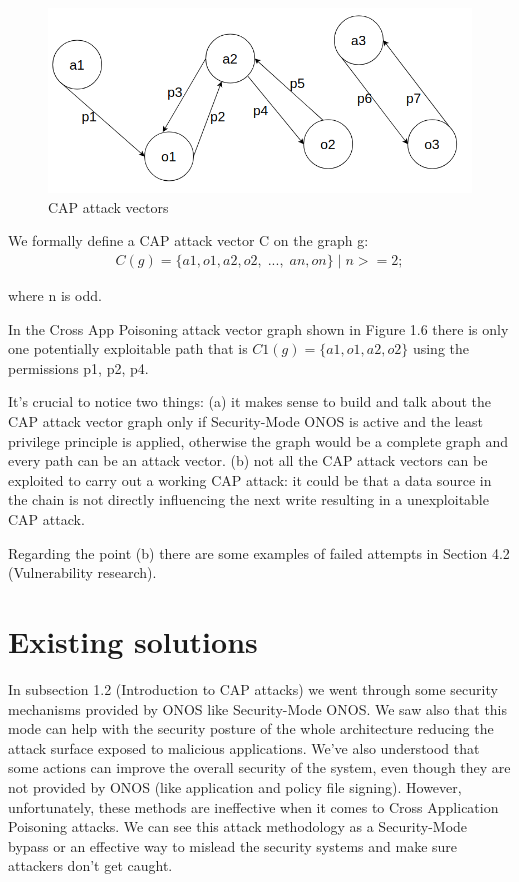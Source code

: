 \begin{figure}[h]
\caption{CAP attack vectors}
\label{fig:cap-vectors}
\includegraphics[width=1.0\textwidth]{resources/Chapter-1/cap-vectors.png}
\centering
\end{figure}

We formally define a CAP attack vector C on the graph g:
\begin{align}
C(g) = \{a1,o1,a2,o2,\;...,\;an,on\} \;|\; n >= 2; 
\end{align}

where n is odd.

In the Cross App Poisoning attack vector graph shown in Figure 1.6 there is only one potentially exploitable path that is $C1(g) = \{a1, o1, a2, o2\}$ using the permissions p1, p2, p4. 

It's crucial to notice two things: (a) it makes sense to build and talk about the CAP attack vector graph only if Security-Mode ONOS is active and the least privilege principle is applied, otherwise the graph would be a complete graph and every path can be an attack vector. (b) not all the CAP attack vectors can be exploited to carry out a working CAP attack: it could be that a data source in the chain is not directly influencing the next write resulting in a unexploitable CAP attack.

Regarding the point (b) there are some examples of failed attempts in Section 4.2 (Vulnerability research). 

\clearpage

\section{Existing solutions}
In subsection 1.2 (Introduction to CAP attacks) we went through some security mechanisms provided by ONOS like Security-Mode ONOS. We saw also that this mode can help with the security posture of the whole architecture reducing the attack surface exposed to malicious applications. We've also understood that some actions can improve the overall security of the system, even though they are not provided by ONOS (like application and policy file signing). However, unfortunately, these methods are ineffective when it comes to Cross Application Poisoning attacks. We can see this attack methodology as a Security-Mode bypass or an effective way to mislead the security systems and make sure attackers don't get caught.

